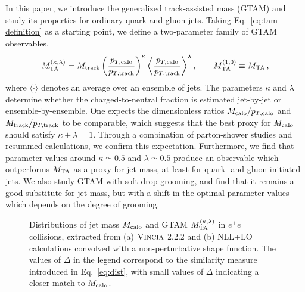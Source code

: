 \documentclass[letterpaper,11pt]{article}
\newcommand{\Eq}[1]{Eq.~\eqref{#1}}
\begin{document}
In this paper, we introduce the generalized track-assisted mass (GTAM) and study its properties for ordinary quark and gluon jets.
%
Taking \Eq{eq:tam-definition} as a starting point, we define a two-parameter family of GTAM observables,
\begin{equation}
\label{eq:gtam-intro}
M_{\rm TA}^{(\kappa,\lambda)} = M_{\rm track} \left(\frac{p_{T,\rm calo}}{p_{T,\rm track}}\right)^\kappa \bigg\langle \frac{p_{T,\rm calo}}{p_{T,\rm track}} \bigg\rangle^\lambda\,, \qquad M_{\rm TA}^{(1,0)} \equiv M_{\rm TA}\,,
\end{equation}
where $\langle \cdot \rangle$ denotes an average over an ensemble of jets. 
%
The parameters $\kappa$ and $\lambda$ determine whether the charged-to-neutral fraction is estimated jet-by-jet or ensemble-by-ensemble.
%
One expects the dimensionless ratios $M_{\rm calo}/p_{T,\rm calo}$ and $M_{\rm track}/p_{T,\rm track}$ to be comparable, which suggests that the best proxy for $M_{\rm calo}$ should satisfy $\kappa + \lambda = 1$.
%
Through a combination of parton-shower studies and resummed calculations, we confirm this expectation.
%
Furthermore, we find that parameter values around $\kappa \simeq 0.5$ and $\lambda \simeq 0.5$ produce an observable which outperforms $M_{\rm TA}$ as a proxy for jet mass, at least for quark- and gluon-initiated jets.
%
We also study GTAM with soft-drop grooming, and find that it remains a good substitute for jet mass, but with a shift in the optimal parameter values which depends on the degree of grooming.

\begin{figure}[t]
	\centering
	\caption{Distributions of jet mass $M_{\rm calo}$ and GTAM $M_{\rm TA}^{(\kappa,\lambda)}$ in $e^+e^-$ collisions, extracted from (a) $\textsc{Vincia}$ 2.2.2 and (b) NLL+LO calculations convolved with a non-perturbative shape function.  The values of $\Delta$ in the legend correspond to the similarity measure introduced in \Eq{eq:dist}, with small values of $\Delta$ indicating a closer match to $M_{\rm calo}$.}
	\label{fig:intro-comp}
\end{figure}
\end{document}
